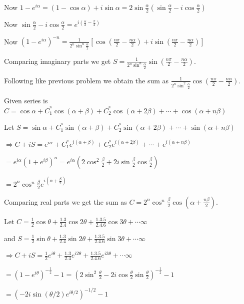   Now $1 - e^{i\alpha} = (1 - \cos\alpha) + i\sin\alpha = 2\sin\frac{\alpha}{2}\left(\sin\frac{\alpha}{2} -
  i\cos\frac{\alpha}{2}\right)$

  Now $\sin\frac{\alpha}{2} - i\cos\frac{\alpha}{2} = e^{i\left(\frac{\alpha}{2} - \frac{\pi}{2}\right)}$

  Now $\left(1 - e^{i\alpha}\right)^{-n} = \frac{1}{2^n\sin^n\frac{\alpha}{2}}\left[\cos\left(\frac{n\pi}{2}
    - \frac{n\alpha}{2}\right) + i\sin\left(\frac{n\pi}{2} - \frac{n\alpha}{2}\right)\right]$

  Comparing imaginary parts we get $S = \frac{1}{2^n\sin^n\frac{\alpha}{2}}\sin\left(\frac{n\pi}{2} -
  \frac{n\alpha}{2}\right)$.
\item Following like previous problem we obtain the sum as
  $\frac{1}{2^n\sin^2\frac{\alpha}{2}}\cos\left(\frac{n\pi}{2} - \frac{n\alpha}{2}\right)$.
\item Given series is $C = \cos\alpha + C_1^^n\cos(\alpha + \beta) + C_2^^n\cos(\alpha + 2\beta) + \cdots +
  \cos(\alpha + n\beta)$

  Let $S = \sin\alpha + C_1^^n\sin(\alpha + \beta) + C_2^^n\sin(\alpha + 2\beta) + \cdots +
  \sin(\alpha + n\beta)$

  $\Rightarrow C + iS = e^{i\alpha} + C_1^^ne^{i(\alpha + \beta)} + C_2^^ne^{i(\alpha + 2\beta)} + \cdots +
  e^{i(\alpha + n\beta)}$

  $= e^{i\alpha}\left(1 + e^{i\beta}\right)^n = e^{i\alpha}\left(2\cos^2\frac{\beta}{2} +
  2i\sin\frac{\beta}{2}\cos\frac{\beta}{2}\right)$

  $= 2^n\cos^n\frac{\beta}{2}e^{i\left(\alpha + \frac{\beta}{2}\right)}$

  Comparing real parts we get the sum as $C = 2^n\cos^n\frac{\beta}{2}\cos\left(\alpha +
  \frac{n\beta}{2}\right)$.
\item Let $C = \frac{1}{2}\cos\theta + \frac{1.3}{2.4}\cos2\theta + \frac{1.3.5}{2.4.6}\cos3\theta +
  \cdots \infty$

  and $S = \frac{1}{2}\sin\theta + \frac{1.3}{2.4}\sin2\theta + \frac{1.3.5}{2.4.6}\sin3\theta +
  \cdots \infty$

  $\Rightarrow C + iS = \frac{1}{2}e^{i\theta} + \frac{1.3}{2.4}e^{i2\theta} +
  \frac{1.3.5}{2.4.6}e^{i3\theta} + \cdots \infty$

  $= \left(1 - e^{i\theta}\right)^{-\frac{1}{2}} - 1 = \left(2\sin^2\frac{\theta}{2} -
  2i\cos\frac{\theta}{2}\sin\frac{\theta}{2}\right)^{-\frac{1}{2}} - 1$

  $= \left(-2i\sin(\theta/2)e^{i\theta/2}\right)^{-1/2} - 1$

